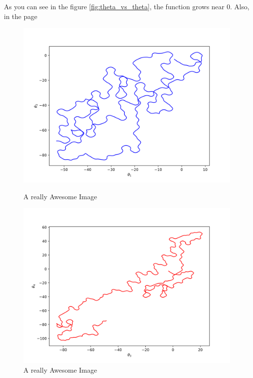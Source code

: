 \documentclass[runningheads]{llncs}
\begin{document}
As you can see in the figure \ref{fig:theta_vs_theta}, the 
function grows near 0. Also, in the page \pageref{fig:theta_vs_theta} 


\begin{figure}[!htb]
  \includegraphics[width=\linewidth]{img/theta_theta_1.png}
  \caption{A really Awesome Image}\label{fig:theta_vs_theta_1}
\endminipage\hfill
{}
  \includegraphics[width=\linewidth]{img/theta_theta_2.png}
  \caption{A really Awesome Image}\label{fig:theta_vs_theta_2}
\endminipage\hfill
{}%

\end{figure}
\end{document}
